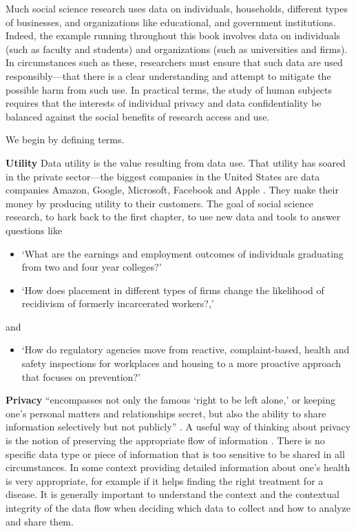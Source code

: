 \documentclass[]{krantz}
\providecommand{\tightlist}{%
  \setlength{\itemsep}{0pt}\setlength{\parskip}{0pt}}
\begin{document}
Much social science research uses data on individuals, households,
different types of businesses, and organizations like educational, and
government institutions. Indeed, the example running throughout this
book involves data on individuals (such as faculty and students) and
organizations (such as universities and firms). In circumstances such as
these, researchers must ensure that such data are used
responsibly---that there is a clear understanding and attempt to
mitigate the possible harm from such use. In practical terms, the study
of human subjects requires that the interests of individual privacy and
data confidentiality be balanced against the social benefits of research
access and use.

We begin by defining terms.

\textbf{Utility} Data utility is the value resulting from data use. That
utility has soared in the private sector---the biggest companies in the
United States are data companies Amazon, Google, Microsoft, Facebook and
Apple \citep{galloway2017four}. They make their money by producing
utility to their customers. The goal of social science research, to hark
back to the first chapter, to use new data and tools to answer questions
like

\begin{itemize}
\item
  `What are the earnings and employment outcomes of individuals
  graduating from two and four year colleges?'
\item
  `How does placement in different types of firms change the likelihood
  of recidivism of formerly incarcerated workers?,'
\end{itemize}

and

\begin{itemize}
\tightlist
\item
  `How do regulatory agencies move from reactive, complaint-based,
  health and safety inspections for workplaces and housing to a more
  proactive approach that focuses on prevention?'
\end{itemize}

\textbf{Privacy} ``encompasses not only the famous `right to be left
alone,' or keeping one's personal matters and relationships secret, but
also the ability to share information selectively but not publicly''
\citep{house2014big}. A useful way of thinking about privacy is the
notion of preserving the appropriate flow of information
\citep{nissenbaum2009}. There is no specific data type or piece of
information that is too sensitive to be shared in all circumstances. In
some context providing detailed information about one's health is very
appropriate, for example if it helps finding the right treatment for a
disease. It is generally important to understand the context and the
contextual integrity of the data flow when deciding which data to
collect and how to analyze and share them.
\end{document}
